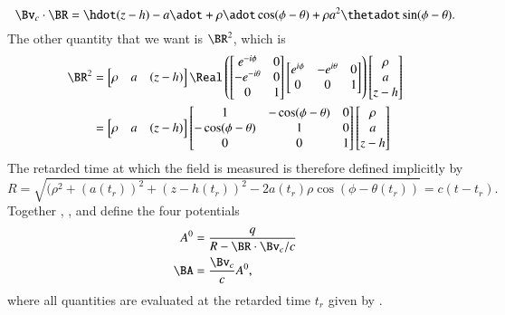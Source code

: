 {\begin{equation}
\Bv_c \cdot \BR = \hdot (z - h) -a \adot + \rho \adot \cos(\phi- \theta) + \rho a^2 \thetadot \sin(\phi - \theta).
\end{equation}
The other quantity that we want is \(\BR^2\), which is
\begin{equation}\label{eqn:relativisticElectrodynamicsExamReflection:1270}
\begin{aligned}
\BR^2 &=
\begin{bmatrix}
\rho &
a &
(z - h)
\end{bmatrix}
\Real \left(
\begin{bmatrix}
e^{-i\phi}  & 0 \\
-e^{-i\theta}  & 0 \\
0 & 1
\end{bmatrix}
\begin{bmatrix}
e^{i\phi} & -e^{i\theta} & 0 \\
0 & 0 & 1
\end{bmatrix}
\right)
\begin{bmatrix}
\rho \\
a \\
z - h
\end{bmatrix} \\
&=
\begin{bmatrix}
\rho &
a &
(z - h)
\end{bmatrix}
\begin{bmatrix}
1 & -\cos(\phi-\theta) & 0 \\
-\cos(\phi-\theta) & 1 & 0 \\
0 & 0 & 1
\end{bmatrix}
\begin{bmatrix}
\rho \\
a \\
z - h
\end{bmatrix} \\
\end{aligned}
\end{equation}
%
The retarded time at which the field is measured is therefore defined implicitly by
%
\begin{equation}\label{eqn:relativisticElectrodynamicsExamReflection:900}
R = \sqrt{(\rho^2 + (a(t_r))^2 + (z-h(t_r))^2 - 2 a(t_r) \rho \cos(\phi - \theta(t_r))} = c( t - t_r).
\end{equation}
%
Together , , and  define the four potentials
%
\begin{equation}\label{eqn:relativisticElectrodynamicsExamReflection:910}
\begin{aligned}
A^0 &= \frac{q}{R - \BR \cdot \Bv_c/c} \\
\BA &= \frac{\Bv_c}{c} A^0,
\end{aligned}
\end{equation}
%
where all quantities are evaluated at the retarded time \(t_r\) given by .

}
